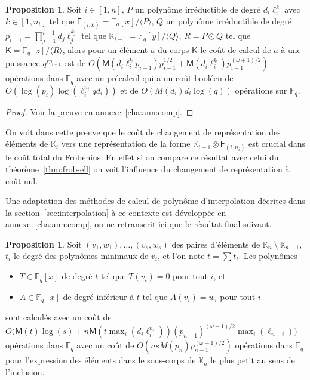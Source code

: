 \documentclass[10pt,a4paper]{book}
\theoremstyle{plain}
\theoremstyle{definition}
\theoremstyle{definition}
\theoremstyle{definition}
\newtheorem{prop}[thm]{Proposition}
\theoremstyle{definition}
\theoremstyle{remark}
\theoremstyle{remark}
\theoremstyle{definition}
\begin{document}
\begin{prop}
\label{pro:fro:com}
Soit $i \in [1,n]$, $P$ un polynôme irréductible de degré $d_i\ell_i^{k}$ avec 
$k \in [1,n_i]$ tel que $\mathsf{F}_{(i,k)}=\mathbb{F}_q[x]/\langle P \rangle$,
$Q$ un polynôme irréductible de degré $p_{i-1}=\prod_{j=1}^{i-1}d_j\ell_j^{k_j}$
tel que $\mathbb{K}_{i-1}=\mathbb{F}_q[y]/\langle Q \rangle$, $R=P \odot Q$ 
tel que  $\mathsf{K}=\mathbb{F}_q[z]/\langle R\rangle$, alors pour un 
élément $a$ du corps $\mathsf{K}$ le coût de calcul de $a$ à une puissance 
$q^{r p_{i-1}}$ est de 
$O(\mathsf{M}(d_i\ell_i^{k}p_{i-1})p_{i-1}^{1/2}+\mathsf{M}(d_i\ell_i^{k})p_{i-1}^{(\omega+1)/2})$ 
opérations dans $\mathbb{F}_q$ avec un 
précalcul qui a un coût booléen de $O(\log(p_{i})\log(\ell_i^{n_i}qd_i))$ et  
de $O( M(d_i) d_i\log(q))$ opérations sur $\mathbb{F}_q$.
\end{prop}

\begin{proof}
Voir la preuve en annexe~\ref{cha:ann:comp}.
\end{proof}


On voit dans cette preuve que le coût de changement de représentation des 
éléments de $\mathbb{K}_i$ vers une représentation de la forme 
$\mathbb{K}_{i-1} \otimes \mathsf{F}_{(i,n_i)}$ est crucial dans le coût total
du Frobenius. En effet si on compare ce résultat avec celui du 
théorème~\ref{thm:frob-ell} on voit l'influence du changement de représentation
à coût nul.

Une adaptation des méthodes de calcul de polynôme d'interpolation décrites dans
la section~\ref{sec:interpolation} à ce contexte est développée en 
annexe~\ref{cha:ann:comp}, on ne retranscrit ici que le résultat final suivant.

\begin{prop}\label{prop:interpol:comp}
  Soit $(v_1,w_1),\dots,(v_s,w_s)$ des paires d'éléments de $\mathbb{K}_n~\setminus~\mathbb{K}_{n-1}$, $t_i$ le degré des polynômes minimaux de $v_i$, 
  et l'on note  $t=\sum t_i$. 
  Les polynômes
  \begin{itemize}
  \item $T\in \mathbb{F}_q[x]$ de degré $t$ tel que $T(v_i)=0$ pour tout $i$,
    et
  \item $A\in \mathbb{F}_q[x]$ de degré inférieur à $t$ tel que $A(v_i)=w_i$ pour
    tout $i$
  \end{itemize}
  sont calculés avec un coût de
  $O\bigl(\mathsf{M}(t)\log(s) + n\mathsf{M}(t \max_i(d_i\ell_i^{n_i}))(p_{n-1})^{(\omega-1)/2} \max_{i}(\ell_{n-i})\bigr)$ 
  opérations dans $\mathbb{F}_q$ avec un coût de 
  $O(nsM(p_n)p_{n-1}^{(\omega-1)/2})$ opérations dans $\mathbb{F}_q$ pour 
  l'expression des éléments dans le sous-corps de $\mathbb{K}_n$ le plus petit 
  au sens de l'inclusion.
\end{prop}
\end{document}
